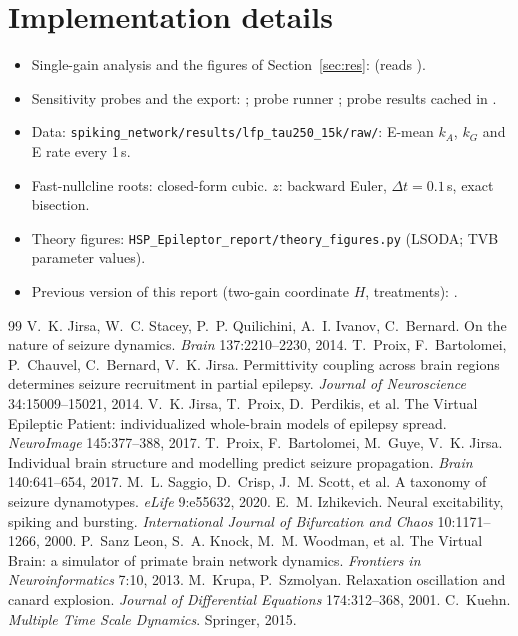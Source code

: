 \documentclass[11pt]{article}
\newcommand{\kA}{k_A}
\newcommand{\kG}{k_G}
\begin{document}
\appendix
\section{Implementation details}
\begin{itemize}
\item Single-gain analysis and the figures of Section~\ref{sec:res}: 
(reads ).
\item Sensitivity probes and the export: ; probe runner
; probe results cached in .
\item Data: \texttt{spiking\_network/results/lfp\_tau250\_15k/raw/}: E-mean $\kA$, $\kG$ and E rate every 1\,s.
\item Fast-nullcline roots: closed-form cubic. $z$: backward Euler, $\Delta t=0.1$\,s, exact bisection.
\item Theory figures: \texttt{HSP\_Epileptor\_report/theory\_figures.py} (LSODA; TVB parameter values).
\item Previous version of this report (two-gain coordinate $H$, treatments): .
\end{itemize}

\begin{thebibliography}{99}\small
{} V.~K. Jirsa, W.~C. Stacey, P.~P. Quilichini, A.~I. Ivanov, C.~Bernard. On the nature of seizure
dynamics. \emph{Brain} 137:2210--2230, 2014.
 T.~Proix, F.~Bartolomei, P.~Chauvel, C.~Bernard, V.~K. Jirsa. Permittivity coupling across brain
regions determines seizure recruitment in partial epilepsy. \emph{Journal of Neuroscience} 34:15009--15021, 2014.
 V.~K. Jirsa, T.~Proix, D.~Perdikis, et al. The Virtual Epileptic Patient: individualized whole-brain
models of epilepsy spread. \emph{NeuroImage} 145:377--388, 2017.
 T.~Proix, F.~Bartolomei, M.~Guye, V.~K. Jirsa. Individual brain structure and modelling predict
seizure propagation. \emph{Brain} 140:641--654, 2017.
 M.~L. Saggio, D.~Crisp, J.~M. Scott, et al. A taxonomy of seizure dynamotypes. \emph{eLife}
9:e55632, 2020.
 E.~M. Izhikevich. Neural excitability, spiking and bursting. \emph{International Journal of
Bifurcation and Chaos} 10:1171--1266, 2000.
 P.~Sanz Leon, S.~A. Knock, M.~M. Woodman, et al. The Virtual Brain: a simulator of primate brain
network dynamics. \emph{Frontiers in Neuroinformatics} 7:10, 2013.
 M.~Krupa, P.~Szmolyan. Relaxation oscillation and canard explosion. \emph{Journal of Differential
Equations} 174:312--368, 2001.
 C.~Kuehn. \emph{Multiple Time Scale Dynamics}. Springer, 2015.
\end{thebibliography}
\end{document}
